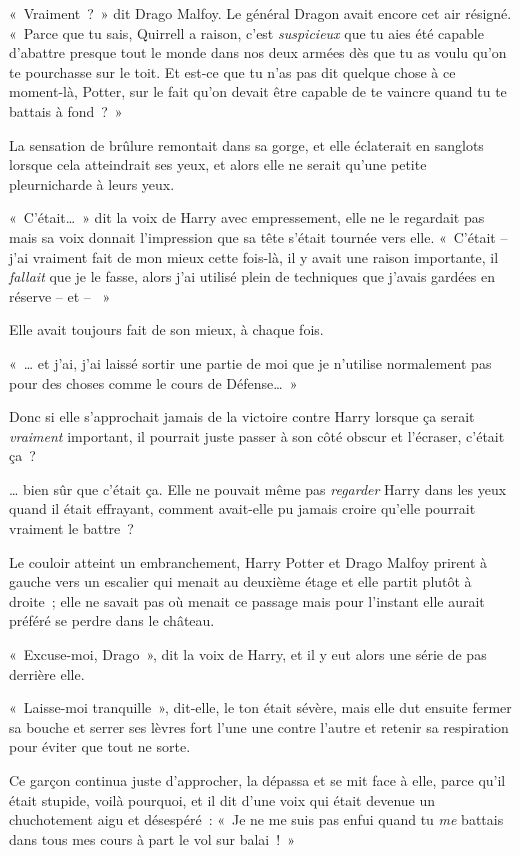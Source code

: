 «~Vraiment~?~»
dit Drago Malfoy.
Le général Dragon avait encore cet air résigné.
«~Parce que tu sais, Quirrell a raison, c'est \emph{suspicieux} que tu aies été capable d'abattre presque tout le monde dans nos deux armées dès que tu as voulu qu'on te pourchasse sur le toit.
Et est-ce que tu n'as pas dit quelque chose à ce moment-là, Potter, sur le fait qu'on devait être capable de te vaincre quand tu te battais à fond~?~»

La sensation de brûlure remontait dans sa gorge, et elle éclaterait en sanglots lorsque cela atteindrait ses yeux, et alors elle ne serait qu'une petite pleurnicharde à leurs yeux.

«~C'était…~»
dit la voix de Harry avec empressement, elle ne le regardait pas mais sa voix donnait l'impression que sa tête s'était tournée vers elle.
«~C'était -- j'ai vraiment fait de mon mieux cette fois-là, il y avait une raison importante, il \emph{fallait} que je le fasse, alors j'ai utilisé plein de techniques que j'avais gardées en réserve -- et -- ~»

Elle avait toujours fait de son mieux, à chaque fois.

«~… et j'ai, j'ai laissé sortir une partie de moi que je n'utilise normalement pas pour des choses comme le cours de Défense…~»

Donc si elle s'approchait jamais de la victoire contre Harry lorsque ça serait \emph{vraiment} important, il pourrait juste passer à son côté obscur et l'écraser, c'était ça~?

… bien sûr que c'était ça.
Elle ne pouvait même pas \emph{regarder} Harry dans les yeux quand il était effrayant, comment avait-elle pu jamais croire qu'elle pourrait vraiment le battre~?

Le couloir atteint un embranchement, Harry Potter et Drago Malfoy prirent à gauche vers un escalier qui menait au deuxième étage et elle partit plutôt à droite~; elle ne savait pas où menait ce passage mais pour l'instant elle aurait préféré se perdre dans le château.

«~Excuse-moi, Drago~», dit la voix de Harry, et il y eut alors une série de pas derrière elle.

«~Laisse-moi tranquille~», dit-elle, le ton était sévère, mais elle dut ensuite fermer sa bouche et serrer ses lèvres fort l'une une contre l'autre et retenir sa respiration pour éviter que tout ne sorte.

Ce garçon continua juste d'approcher, la dépassa et se mit face à elle, parce qu'il était stupide, voilà pourquoi, et il dit d'une voix qui était devenue un chuchotement aigu et désespéré~: «~Je ne me suis pas enfui quand tu \emph{me} battais dans tous mes cours à part le vol sur balai~!~»

